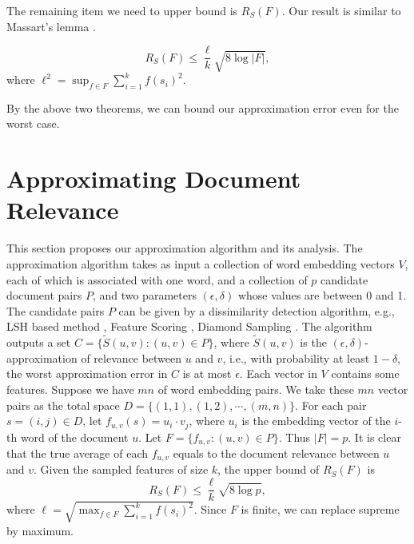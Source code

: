 \documentclass{article}
\begin{document}
The remaining item we need to upper bound is $R_S(F)$. Our result is similar to Massart's lemma \cite{AGO14}.

\begin{theorem}
\label{thm2}
$$R_S(F) \leq \frac{\ell}{k}\sqrt{8\log |F|},$$
where $\ell^2 = \sup_{f\in F}\sum_{i=1}^k f(s_i)^2$.
\end{theorem}

By the above two theorems, we can bound our approximation error even for the worst case.


\section{Approximating Document Relevance}
\label{sec:acs}
This section proposes our approximation algorithm and its analysis.
{\color{black}
The approximation algorithm takes as input a collection of word embedding vectors $V$, each of which is associated with one word, and a collection of $p$ candidate document pairs $P$, and two parameters $(\epsilon, \delta)$ whose values are between 0 and 1. The candidate pairs $P$ can be given by a dissimilarity detection algorithm, e.g., LSH based method \cite{LRU14}, Feature Scoring \cite{CL99}, Diamond Sampling \cite{BKP15}. The algorithm outputs a set $C = \{\tilde{S}(u,v): (u,v)\in P\}$, where $\tilde{S}(u,v)$ is the $(\epsilon, \delta)$- approximation of relevance between $u$ and $v$, i.e., with probability at least $1-\delta$, the worst approximation error in $C$ is at most $\epsilon$. Each vector in $V$ contains some features. Suppose we have $mn$ of word embedding pairs. We take these $mn$ vector pairs as the total space $D = \{(1,1),(1,2),\cdots,(m,n)\}$. For each pair $s=(i,j)\in D$, let $f_{u,v}(s) = u_i\cdot v_j$, where $u_i$ is the embedding vector of the $i$-th word of the document $u$. Let $F = \{f_{u,v}: (u,v)\in P\}$. Thus $|F| = p$. It is clear that the true average of each $f_{u,v}$ equals to the document relevance between $u$ and $v$. Given the sampled features of size $k$, the upper bound of $R_S(F)$ is 
$$R_S(F) \leq \frac{\ell}{k}\sqrt{8\log p},$$
where $\ell = \sqrt{\max_{f\in F} \sum_{i=1}^k f(s_i)^2}$. Since $F$ is finite, we can replace supreme by maximum. 
}
\end{document}
